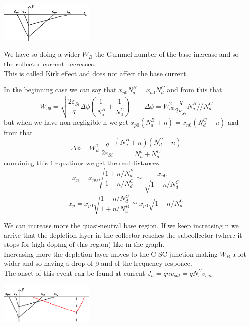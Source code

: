 \centering
\includegraphics[width=0.35\textwidth]{bjt10.png}\\
\raggedright

We have so doing a wider $W_B$ the Gummel number of the base increase and so the collector current decreases.\\
This is called Kirk effect and does not affect the base current.\\
\vspace{5mm}

In the beginning case we can say that $x_{p0}N_a^B=x_{n0}N_d^C$ and from this that 
\begin{equation}
W_{d0}=\sqrt{\frac{2\varepsilon_{Si}}{q}\Delta\phi(\frac{1}{N_a^B}+\frac{1}{N_d^C})} \ \ \ \ \ \ \ \ \ \Delta \phi=W_{d0}^2 \frac{q}{2\varepsilon_{Si}} N_a^B//N_d^C
\end{equation}
but when we have non negligible n we get $x_{p0}(N_a^B+n)=x_{n0}(N_d^C-n)$ and from that 
\begin{equation}
\Delta \phi=W_{d0}^2 \frac{q}{2\varepsilon_{Si}}\frac{(N_a^B+n)(N_d^C-n)}{N_a^b+N_d^C}
\end{equation}
combining this 4 equations we get the real distances 
\begin{equation}
x_n=x_{n0}\sqrt{\frac{1+n/N_a^B}{1-n/N_d^C}}\simeq \frac{x_{n0}}{\sqrt{1-n/N_d^C}}
\end{equation}
\begin{equation}
x_p=x_{p0}\sqrt{\frac{1-n/N_d^C}{1+n/N_a^B}}\simeq x_{p0}\sqrt{1-n/N_d^C}
\end{equation}

We can increase more the quasi-neutral base region. If we keep increasing n we arrive that the depletion layer in the collector reaches the subcollector (where it stops for high doping of this region) like in the graph.\\
Increasing more the depletion layer moves to the C-SC junction making $W_B$ a lot wider and so having a drop of $\beta$ and of the frequency responce.\\
The onset of this event can be found at current $J_n=qnv_{sat}=qN_d^C v_{sat}$

\centering
\includegraphics[width=0.35\textwidth]{bjt11.png}\\
\raggedright


